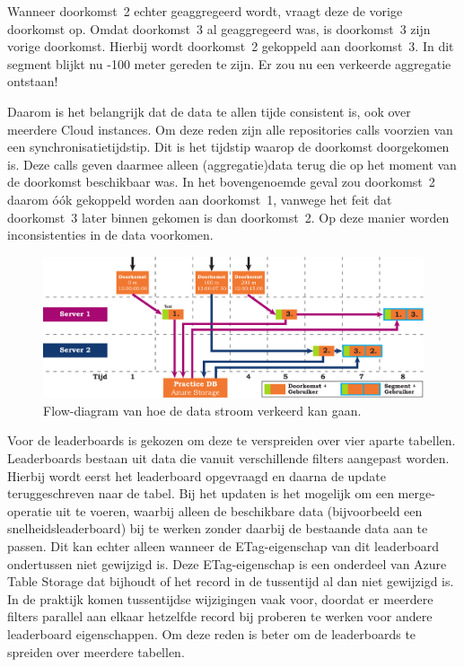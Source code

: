 Wanneer doorkomst~2 echter geaggregeerd wordt, vraagt deze de vorige doorkomst op. Omdat doorkomst~3 al geaggregeerd was, is doorkomst~3 zijn vorige doorkomst. Hierbij wordt doorkomst~2 gekoppeld aan doorkomst~3. In dit segment blijkt nu -100 meter gereden te zijn. Er zou nu een verkeerde aggregatie ontstaan!

Daarom is het belangrijk dat de data te allen tijde consistent is, ook over meerdere Cloud instances.
Om deze reden zijn alle repositories calls voorzien van een synchronisatietijdstip. Dit is het tijdstip waarop de doorkomst doorgekomen is. Deze calls geven daarmee alleen (aggregatie)data terug die op het moment van de doorkomst beschikbaar was. In het bovengenoemde geval zou doorkomst~2 daarom óók gekoppeld worden aan doorkomst~1, vanwege het feit dat doorkomst~3 later binnen gekomen is dan doorkomst~2. Op deze manier worden inconsistenties in de data voorkomen.

\begin{figure}[ht]
  \begin{center}
    \includegraphics[width=\textwidth]{style/images/aggregatie-timing-problem}
  \end{center}
  \caption{Flow-diagram van hoe de data stroom verkeerd kan gaan.}
  \label{fig:aggregatie-timing-problem}
\end{figure}

Voor de leaderboards is gekozen om deze te verspreiden over vier aparte tabellen. Leaderboards bestaan uit data die vanuit verschillende filters aangepast worden. Hierbij wordt eerst het leaderboard opgevraagd en daarna de update teruggeschreven naar de tabel. Bij het updaten is het mogelijk om een merge-operatie uit te voeren, waarbij alleen de beschikbare data (bijvoorbeeld een snelheidsleaderboard) bij te werken zonder daarbij de bestaande data aan te passen. Dit kan echter alleen wanneer de ETag-eigenschap van dit leaderboard ondertussen niet gewijzigd is. Deze ETag-eigenschap is een onderdeel van Azure Table Storage dat bijhoudt of het record in de tussentijd al dan niet gewijzigd is. In de praktijk komen tussentijdse wijzigingen vaak voor, doordat er meerdere filters parallel aan elkaar hetzelfde record bij proberen te werken voor andere leaderboard eigenschappen. Om deze reden is beter om de leaderboards te spreiden over meerdere tabellen.

